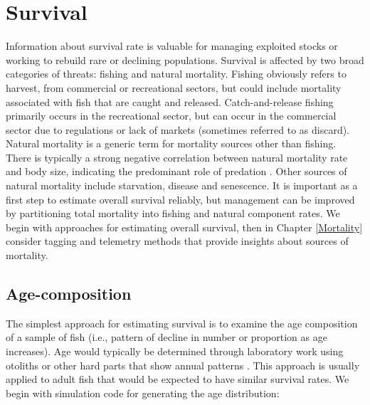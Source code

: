 \documentclass[
]{krantz}
\begin{document}
\hypertarget{Survival}{%
\chapter{Survival}\label{Survival}}

Information about survival rate is valuable for managing exploited stocks or working to rebuild rare or declining populations. Survival is affected by two broad categories of threats: fishing and natural mortality. Fishing obviously refers to harvest, from commercial or recreational sectors, but could include mortality associated with fish that are caught and released. Catch-and-release fishing primarily occurs in the recreational sector, but can occur in the commercial sector due to regulations or lack of markets (sometimes referred to as discard). Natural mortality is a generic term for mortality sources other than fishing. There is typically a strong negative correlation between natural mortality rate and body size, indicating the predominant role of predation \citep{lorenzen1996}. Other sources of natural mortality include starvation, disease and senescence. It is important as a first step to estimate overall survival reliably, but management can be improved by partitioning total mortality into fishing and natural component rates. We begin with approaches for estimating overall survival, then in Chapter \ref{Mortality} consider tagging and telemetry methods that provide insights about sources of mortality.

\hypertarget{AgeComp}{%
\section{Age-composition}\label{AgeComp}}

The simplest approach for estimating survival is to examine the age composition of a sample of fish (i.e., pattern of decline in number or proportion as age increases). Age would typically be determined through laboratory work using otoliths or other hard parts that show annual patterns \citep{campana2001}. This approach is usually applied to adult fish that would be expected to have similar survival rates. We begin with simulation code for generating the age distribution:
\end{document}
